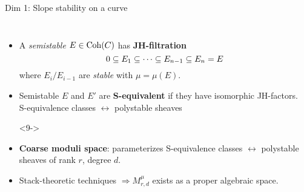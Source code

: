 \documentclass[8pt,handout]{beamer} %
\begin{document}
\begin{frame}[fragile]{Dim 1: Slope stability on a curve}
\begin{columns}[t]
    \begin{itemize}
        \item<7-> A \textit{semistable} $E \in \mathrm{Coh}(C)$ has \textbf{JH-filtration}
        \[ 0 \subseteq E_1 \subseteq \cdots \subseteq E_{n-1} \subseteq E_n = E \]
        where $E_i/E_{i-1}$ are \textit{stable} with $\mu = \mu(E)$.
        \item<8-> Semistable $E$ and $E'$ are \textbf{S-equivalent} if they have isomorphic JH-factors. \\
        S-equivalence classes $\leftrightarrow$ polystable sheaves
        \item[]<9->
        \begin{center}
        \end{center}
        \item<9-> \textbf{Coarse moduli space}: parameterizes S-equivalence classes $\leftrightarrow$ polystable sheaves of rank $r$, degree $d$.
        \item<10-> Stack-theoretic techniques $\Rightarrow M^\mu_{r,d}$ exists as a proper algebraic space.
    \end{itemize}
\end{columns}
\end{frame}
\end{document}
